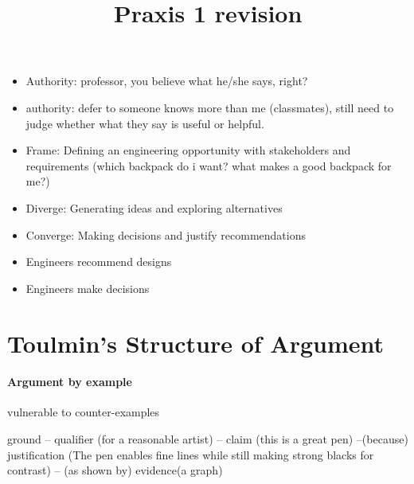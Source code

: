 \documentclass[12pt]{article}
\title{ Praxis 1 revision}
\begin{document}
\maketitle

\begin{itemize}

\item Authority: professor, you believe what he/she says, right?
\item authority: defer to someone knows more than me (classmates), still need to judge whether what they say is useful or helpful.
\item Frame: Defining an engineering opportunity with stakeholders and requirements (which backpack do i want? what makes a good backpack for me?)
\item Diverge: Generating ideas and exploring alternatives
\item Converge: Making decisions and justify recommendations
\item Engineers recommend designs
\item Engineers make decisions

\end{itemize}

\section{Toulmin's Structure of Argument}

\paragraph{Argument by example}

vulnerable to counter-examples

ground -- qualifier (for a reasonable artist) -- claim (this is a great pen) --(because) justification (The pen enables fine lines while still making strong blacks for contrast) -- (as shown by) evidence(a graph)
\end{document}
